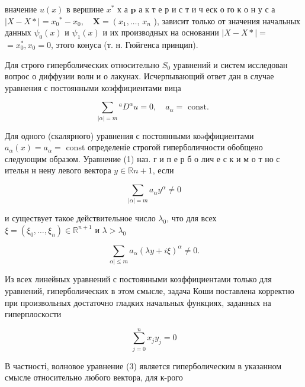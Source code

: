 \documentclass[10pt]{article}
\begin{document}
вначение $u(x)$ в вершине $x^{*}$ х а $\mathbf{p}$ а к т е р и с т и ч еск о го к о н у с а $|X-X *|=x_{0}{ }^{*}-x_{0}, \quad \boldsymbol{X}=\left(x_{1}, \ldots\right.$, $x_{n}$ ), зависит только от значения начальных данных $\psi_{0}(x)$ и $\psi_{1}(x)$ и их производных на основании $|X-X *|=$ $=x_{0}^{*}, x_{0}=0$, этого конуса (т. н. Гюйгенса принцип).



Для строго гиперболических относительно $S_{0}$ уравнений и систем исследован вопрос о диффузии волн и о лакунах. Исчерпывающий ответ дан в случае уравнения с постоянными коэффициентами вица



\[

\sum_{|\alpha|=m}{ }^{a} D^{\alpha} u=0, \quad a_{\alpha}=\text { const. }

\]



Для одного (скалярного) уравнения с постоянными коəффициентами $a_{\alpha}(x)=a_{\alpha}=$ const определеніе строгой гиперболичности обобщено следующим образом. Уравнение (1) наз. г и п е р б о лич е с к и м о т но с ительн н нену левого вектора $y \in \mathbb{R} n+1$, если



\[

\sum_{|\alpha|=m} a_{\alpha} y^{\alpha} \neq 0

\]



и существует такое действительное число $\lambda_{0}$, что для всех $\xi=\left(\xi_{0}, \ldots, \xi_{n}\right) \in \mathbb{R}^{n+1}$ и $\lambda>\lambda_{0}$



\[

\sum_{\alpha \mid \leqslant m} a_{\alpha}(\lambda y+i \xi)^{\alpha} \neq 0 .

\]



Из всех линейных уравнений с постоянными коэффициентами только для уравнений, гиперболических в этом смысле, задача Коши поставлена корректно при произвольных достаточно гладких начальных функциях, заданных на гиперплоскости



\[

\sum_{j=0}^{n} x_{j} y_{j}=0

\]



В частності, волновое уравнение (3) является гиперболическим в указанном смысле относительно любого вектора, для к-рого
\end{document}
